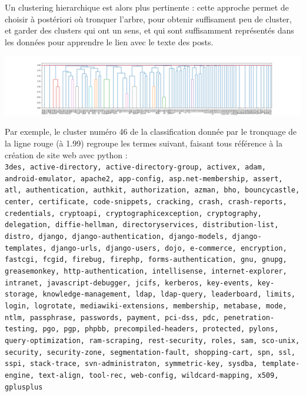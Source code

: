 \documentclass[a4paper,11pt]{article}
\begin{document}
Un clustering hierarchique est alors plus pertinente : cette approche permet de choisir à postériori où tronquer l'arbre, pour obtenir suffisament peu de cluster, et garder des clusters qui ont un sens, et qui sont suffisamment représentés dans les données pour apprendre le lien avec le texte des posts. 

\begin{center}
   \includegraphics[width=\linewidth]{figures/hierarchical_clustering.png}
\end{center}
Par exemple, le cluster numéro 46 de la classification donnée par le tronquage de la ligne rouge (à 1.99) regroupe les termes suivant, faisant tous référence à la création de site web avec python : \\
{\small \centering \texttt{3des, active-directory, active-directory-group, activex, adam, android-emulator, apache2, app-config, asp.net-membership, assert, atl, authentication, authkit, authorization, azman, bho,  bouncycastle, center, certificate, code-snippets, cracking, crash,  crash-reports, credentials, cryptoapi, cryptographicexception,  cryptography, delegation, diffie-hellman, directoryservices,  distribution-list, distro, django, django-authentication,  django-models, django-templates, django-urls, django-users, dojo,  e-commerce, encryption, fastcgi, fcgid, firebug, firephp,  forms-authentication, gnu, gnupg, greasemonkey, http-authentication,  intellisense, internet-explorer, intranet, javascript-debugger,  jcifs, kerberos, key-events, key-storage, knowledge-management,  ldap, ldap-query, leaderboard, limits, login, logrotate,  mediawiki-extensions, membership, metabase, mode, ntlm, passphrase, passwords, payment, pci-dss, pdc, penetration-testing, pgo, pgp,  phpbb, precompiled-headers, protected, pylons, query-optimization,  ram-scraping, rest-security, roles, sam, sco-unix, security,  security-zone, segmentation-fault, shopping-cart, spn, ssl, sspi,  stack-trace, svn-administraton, symmetric-key, sysdba,  template-engine, text-align, tool-rec, web-config, wildcard-mapping,  x509, gplusplus}}\\
\end{document}
